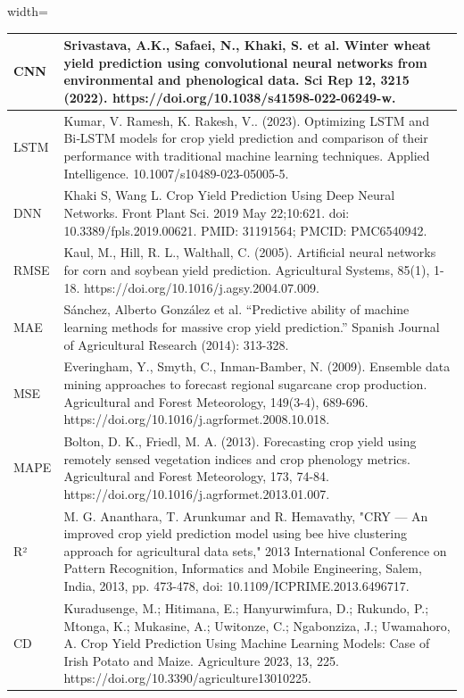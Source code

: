 \documentclass[conference]{IEEEtran}
\begin{document}
\begin{table}[htbp]
\begin{adjustbox}{width=\textwidth}
\begin{tabular}{|p{2cm}|p{14cm}|}
\hline
CNN & Srivastava, A.K., Safaei, N., Khaki, S. et al. Winter wheat yield prediction using convolutional neural networks from environmental and phenological data. Sci Rep 12, 3215 (2022). https://doi.org/10.1038/s41598-022-06249-w. \\
\hline
LSTM & Kumar, V. Ramesh, K. Rakesh, V.. (2023). Optimizing LSTM and Bi‑LSTM models for crop yield prediction and comparison of their performance with traditional machine learning techniques. Applied Intelligence. 10.1007/s10489-023-05005-5. \\
\hline
DNN & Khaki S, Wang L. Crop Yield Prediction Using Deep Neural Networks. Front Plant Sci. 2019 May 22;10:621. doi: 10.3389/fpls.2019.00621. PMID: 31191564; PMCID: PMC6540942. \\
\hline
RMSE & Kaul, M., Hill, R. L., Walthall, C. (2005). Artificial neural networks for corn and soybean yield prediction. Agricultural Systems, 85(1), 1-18. https://doi.org/10.1016/j.agsy.2004.07.009. \\
\hline
MAE & Sánchez, Alberto González et al. “Predictive ability of machine learning methods for massive crop yield prediction.” Spanish Journal of Agricultural Research (2014): 313-328. \\
\hline
MSE & Everingham, Y., Smyth, C., Inman-Bamber, N. (2009). Ensemble data mining approaches to forecast regional sugarcane crop production. Agricultural and Forest Meteorology, 149(3-4), 689-696. https://doi.org/10.1016/j.agrformet.2008.10.018. \\
\hline
MAPE & Bolton, D. K., Friedl, M. A. (2013). Forecasting crop yield using remotely sensed vegetation indices and crop phenology metrics. Agricultural and Forest Meteorology, 173, 74-84. https://doi.org/10.1016/j.agrformet.2013.01.007. \\
\hline
R² & M. G. Ananthara, T. Arunkumar and R. Hemavathy, "CRY — An improved crop yield prediction model using bee hive clustering approach for agricultural data sets," 2013 International Conference on Pattern Recognition, Informatics and Mobile Engineering, Salem, India, 2013, pp. 473-478, doi: 10.1109/ICPRIME.2013.6496717.\\
\hline
CD & Kuradusenge, M.; Hitimana, E.; Hanyurwimfura, D.; Rukundo, P.; Mtonga, K.; Mukasine, A.; Uwitonze, C.; Ngabonziza, J.; Uwamahoro, A. Crop Yield Prediction Using Machine Learning Models: Case of Irish Potato and Maize. Agriculture 2023, 13, 225. https://doi.org/10.3390/agriculture13010225. \\
\hline
\end{tabular}
\end{adjustbox}
\label{table:key_terms}
\end{table}
\end{document}

